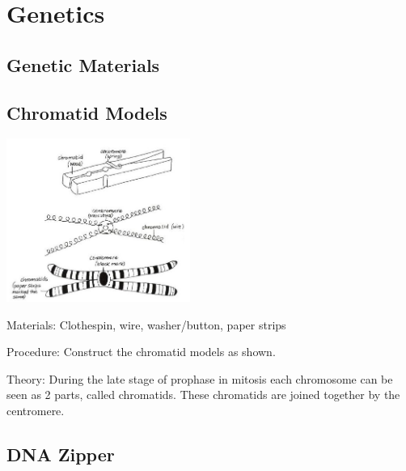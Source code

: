 \section{Genetics}

\begin{multicols}{2}


\section*{Genetic Materials}


\subsection{Chromatid Models} %

\begin{center}
\includegraphics[width=0.45\textwidth]{./img/vso/chromatid.jpg}
\end{center}

\begin{description*}
\item[Materials:]{Clothespin, wire, washer/button, paper strips}
\item[Procedure:]{Construct the chromatid models as shown.}
\item[Theory:]{During the late stage of prophase in mitosis each chromosome can be
seen as 2 parts, called chromatids. These chromatids are joined
together by the centromere.}
\end{description*}

\subsection{DNA Zipper} %


\end{multicols}

